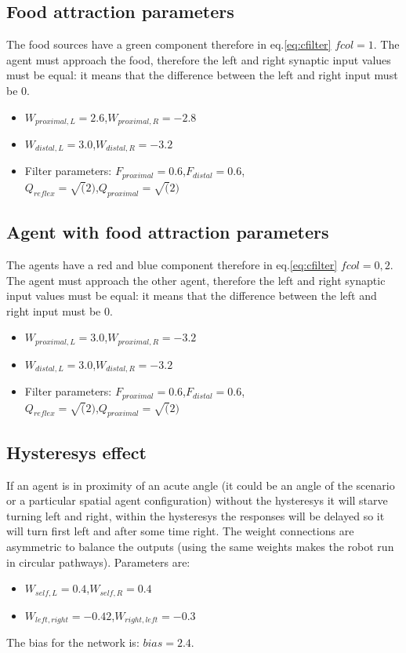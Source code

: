 \subsection{Food attraction parameters}
The food sources have a green component therefore in eq.\ref{eq:cfilter} $fcol=1$.
The agent must approach the food, therefore the left and right synaptic input
values must be equal: it means that the difference between the left and
right input must be 0.
\begin{itemize}
 \item $W_{proximal,L}=2.6$,$W_{proximal,R}=-2.8$
 \item $W_{distal,L}=3.0$,$W_{distal,R}=-3.2$
 \item Filter parameters: $F_{proximal}=0.6$,$F_{distal}=0.6$,\\$Q_{reflex}=\sqrt(2)$,$Q_{proximal}=\sqrt(2)$
\end{itemize}

\subsection{Agent with food attraction parameters}
The agents have a red and blue component therefore in eq.\ref{eq:cfilter} $fcol=0,2$.
The agent must approach the other agent, therefore the left and right synaptic
input values must be equal: it means that the difference between the left
and right input must be 0.
\begin{itemize}
 \item $W_{proximal,L}=3.0$,$W_{proximal,R}=-3.2$
 \item $W_{distal,L}=3.0$,$W_{distal,R}=-3.2$
 \item Filter parameters: $F_{proximal}=0.6$,$F_{distal}=0.6$,\\$Q_{reflex}=\sqrt(2)$,$Q_{proximal}=\sqrt(2)$
\end{itemize}

\subsection{Hysteresys effect \label{Appendix:HysteresysValue}}
If an agent is in proximity of an acute angle (it could be an angle of the
scenario or a particular spatial agent configuration) without the hysteresys
it will starve turning left and right, within the hysteresys the responses will
be delayed so it will turn first left and after some time right.
The weight connections are asymmetric to balance the outputs (using the same
weights makes the robot run in circular pathways).
Parameters are:
\begin{itemize}
 \item $W_{self,L}=0.4$,$W_{self,R}=0.4$
 \item $W_{left,right}=-0.42$,$W_{right,left}=-0.3$
\end{itemize}
The bias for the network is: $bias=2.4$.
